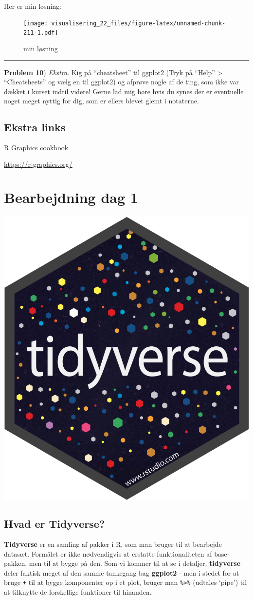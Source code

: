 \documentclass[
]{book}
\begin{document}
Her er min løsning:

\begin{figure}
\centering
\texttt{[image: visualisering\_22\_files/figure-latex/unnamed-chunk-211-1.pdf]}
\caption{\label{fig:unnamed-chunk-211}min løsning}
\end{figure}

\begin{center}\rule{0.5\linewidth}{0.5pt}\end{center}

\textbf{Problem 10}) \emph{Ekstra}. Kig på ``cheatsheet'' til ggplot2 (Tryk på ``Help'' \textgreater{} ``Cheatsheets'' og vælg en til ggplot2) og afprøve nogle af de ting, som ikke var dækket i kurset indtil videre! Gerne lad mig høre hvis du synes der er eventuelle noget meget nyttig for dig, som er ellers blevet glemt i notaterne.

\hypertarget{ekstra-links-1}{%
\section{Ekstra links}\label{ekstra-links-1}}

R Graphics cookbook

\url{https://r-graphics.org/}

\hypertarget{data}{%
\chapter{Bearbejdning dag 1}\label{data}}

\includegraphics[width=0.15\linewidth]{plots/hex-tidyverse}

\hypertarget{hvad-er-tidyverse}{%
\section{Hvad er Tidyverse?}\label{hvad-er-tidyverse}}

\textbf{Tidyverse} er en samling af pakker i R, som man bruger til at bearbejde datasæt. Formålet er ikke nødvendigvis at erstatte funktionaliteten af base-pakken, men til at bygge på den. Som vi kommer til at se i detaljer, \textbf{tidyverse} deler faktisk meget af den samme tankegang bag \textbf{ggplot2} - men i stedet for at bruge \texttt{+} til at bygge komponenter op i et plot, bruger man \texttt{\%\textgreater{}\%} (udtales `pipe') til at tilknytte de forskellige funktioner til hinanden.
\end{document}
